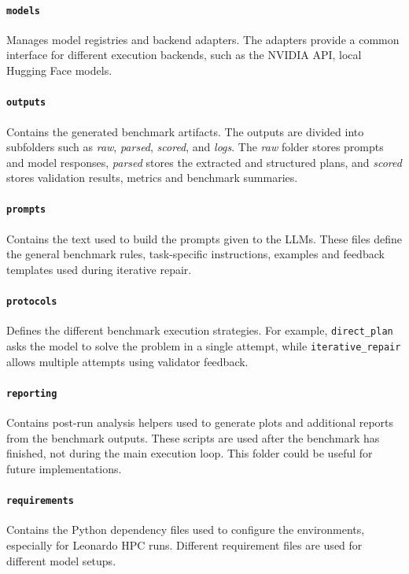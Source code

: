 \paragraph{\texttt{models}}
Manages model registries and backend adapters. The adapters provide a common interface for different execution backends, such as the NVIDIA API, local Hugging Face models.

\paragraph{\texttt{outputs}}
Contains the generated benchmark artifacts. The outputs are divided into subfolders such as \textit{raw}, \textit{parsed}, \textit{scored}, and \textit{logs}. The \textit{raw} folder stores prompts and model responses, \textit{parsed} stores the extracted and structured plans, and \textit{scored} stores validation results, metrics and benchmark summaries.

\paragraph{\texttt{prompts}}
Contains the text used to build the prompts given to the LLMs. These files define the general benchmark rules, task-specific instructions, examples and feedback templates used during iterative repair.

\paragraph{\texttt{protocols}}
Defines the different benchmark execution strategies. For example, \texttt{direct_plan} asks the model to solve the problem in a single attempt, while \texttt{iterative_repair} allows multiple attempts using validator feedback.

\paragraph{\texttt{reporting}}
Contains post-run analysis helpers used to generate plots and additional reports from the benchmark outputs. These scripts are used after the benchmark has finished, not during the main execution loop. This folder could be useful for future implementations.

\paragraph{\texttt{requirements}}
Contains the Python dependency files used to configure the environments, especially for Leonardo HPC runs. Different requirement files are used for different model setups.


